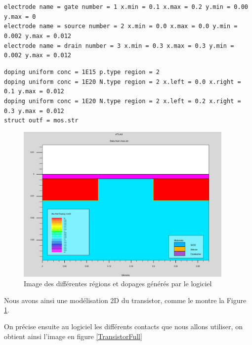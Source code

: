 \documentclass[a4paper,11pt]{report}
\begin{document}
\noindent\texttt{electrode name = gate   number = 1 x.min = 0.1 x.max = 0.2 y.min = 0.00 y.max = 0\\
electrode name = source number = 2 x.min = 0.0 x.max = 0.0 y.min = 0.002 y.max = 0.012\\
electrode name = drain  number = 3 x.min = 0.3 x.max = 0.3 y.min = 0.002 y.max = 0.012}
\vspace{0.3cm}

\noindent\texttt{doping uniform conc = 1E15 p.type region = 2\\
doping uniform conc = 1E20 N.type region = 2 x.left = 0.0 x.right = 0.1 y.max = 0.012\\
doping uniform conc = 1E20 N.type region = 2 x.left = 0.2 x.right = 0.3 y.max = 0.012\\
struct outf = mos.str}




\begin{figure}
\centering
\includegraphics[width=300pt]{Simu1-Dopage.png}
\caption{Image des différentes régions et dopages générés par le logiciel}
\label{transistortonyplot}
\end{figure}

Nous avons ainsi une modélisation 2D du transistor, comme le montre la Figure \ref{transistortonyplot}.

On précise ensuite au logiciel les différents contacts que nous allons utiliser, on obtient ainsi l'image en figure \ref{TransistorFull}
\end{document}
